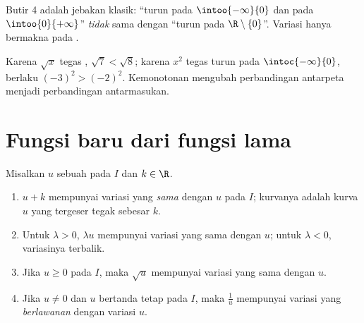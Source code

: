 \begin{remark}
Butir 4 adalah jebakan klasik: ``turun pada $\intoo{-\infty}{0}$ dan pada
$\intoo{0}{+\infty}$'' \emph{tidak} sama dengan ``turun pada
$\R \setminus \{0\}$''. Variasi hanya bermakna pada .
\end{remark}

\begin{example}
Karena $\sqrt x$ tegas , $\sqrt{7} < \sqrt{8}$; karena
$x^2$ tegas turun pada $\intoc{-\infty}{0}$, berlaku
$(-3)^2 > (-2)^2$. Kemonotonan mengubah perbandingan antarpeta menjadi
perbandingan antarmasukan.
\end{example}

\section{Fungsi baru dari fungsi lama}

\begin{proposition}[Transformasi]\label{prop:g11:func:transforms}
Misalkan $u$ sebuah  pada  $I$ dan $k \in \R$.
\begin{enumerate}
  \item $u + k$ mempunyai variasi yang \emph{sama} dengan $u$ pada $I$;
        kurvanya adalah kurva $u$ yang tergeser tegak sebesar $k$.
  \item Untuk $\lambda > 0$, $\lambda u$ mempunyai variasi yang sama dengan
        $u$; untuk $\lambda < 0$, variasinya terbalik.
  \item Jika $u \geq 0$ pada $I$, maka $\sqrt u$ mempunyai variasi yang sama
        dengan $u$.
  \item Jika $u \neq 0$ dan $u$ bertanda tetap pada $I$, maka $\frac1u$
        mempunyai variasi yang \emph{berlawanan} dengan variasi $u$.
\end{enumerate}
\end{proposition}

